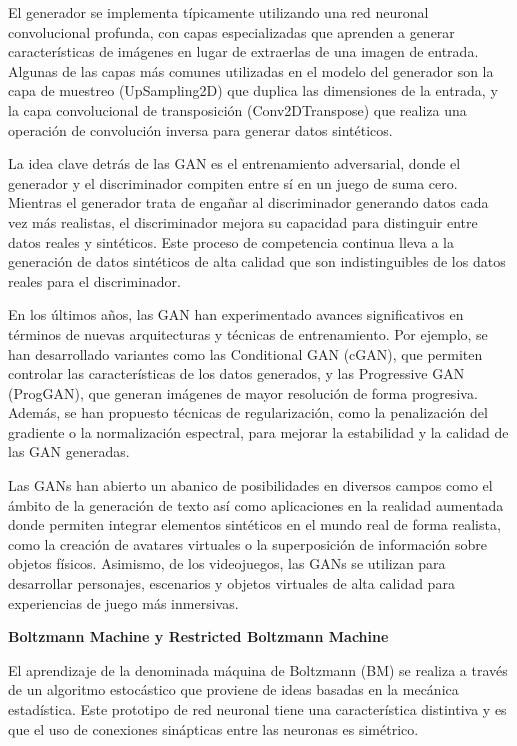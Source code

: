 \documentclass[
  a4paper,
  DIV=11,
  numbers=noendperiod]{scrreprt}
\begin{document}
El generador se implementa típicamente utilizando una red neuronal
convolucional profunda, con capas especializadas que aprenden a generar
características de imágenes en lugar de extraerlas de una imagen de
entrada. Algunas de las capas más comunes utilizadas en el modelo del
generador son la capa de muestreo (UpSampling2D) que duplica las
dimensiones de la entrada, y la capa convolucional de transposición
(Conv2DTranspose) que realiza una operación de convolución inversa para
generar datos sintéticos.

La idea clave detrás de las GAN es el entrenamiento adversarial, donde
el generador y el discriminador compiten entre sí en un juego de suma
cero. Mientras el generador trata de engañar al discriminador generando
datos cada vez más realistas, el discriminador mejora su capacidad para
distinguir entre datos reales y sintéticos. Este proceso de competencia
continua lleva a la generación de datos sintéticos de alta calidad que
son indistinguibles de los datos reales para el discriminador.

En los últimos años, las GAN han experimentado avances significativos en
términos de nuevas arquitecturas y técnicas de entrenamiento. Por
ejemplo, se han desarrollado variantes como las Conditional GAN (cGAN),
que permiten controlar las características de los datos generados, y las
Progressive GAN (ProgGAN), que generan imágenes de mayor resolución de
forma progresiva. Además, se han propuesto técnicas de regularización,
como la penalización del gradiente o la normalización espectral, para
mejorar la estabilidad y la calidad de las GAN generadas.

Las GANs han abierto un abanico de posibilidades en diversos campos como
el ámbito de la generación de texto así como aplicaciones en la realidad
aumentada donde permiten integrar elementos sintéticos en el mundo real
de forma realista, como la creación de avatares virtuales o la
superposición de información sobre objetos físicos. Asimismo, de los
videojuegos, las GANs se utilizan para desarrollar personajes,
escenarios y objetos virtuales de alta calidad para experiencias de
juego más inmersivas.

\textbf{Boltzmann Machine y Restricted Boltzmann Machine}

El aprendizaje de la denominada máquina de Boltzmann (BM) se realiza a
través de un algoritmo estocástico que proviene de ideas basadas en la
mecánica estadística. Este prototipo de red neuronal tiene una
característica distintiva y es que el uso de conexiones sinápticas entre
las neuronas es simétrico.
\end{document}
